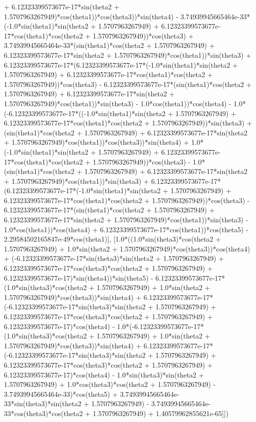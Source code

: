 + 6.12323399573677e-17*sin(theta2 + 1.5707963267949)*cos(theta1))*cos(theta3))*sin(theta4) - 3.74939945665464e-33*(-1.0*sin(theta1)*sin(theta2 + 1.5707963267949) + 6.12323399573677e-17*cos(theta1)*cos(theta2 + 1.5707963267949))*cos(theta3) + 3.74939945665464e-33*(sin(theta1)*cos(theta2 + 1.5707963267949) + 6.12323399573677e-17*sin(theta2 + 1.5707963267949)*cos(theta1))*sin(theta3) + 6.12323399573677e-17*(6.12323399573677e-17*(-1.0*sin(theta1)*sin(theta2 + 1.5707963267949) + 6.12323399573677e-17*cos(theta1)*cos(theta2 + 1.5707963267949))*cos(theta3) - 6.12323399573677e-17*(sin(theta1)*cos(theta2 + 1.5707963267949) + 6.12323399573677e-17*sin(theta2 + 1.5707963267949)*cos(theta1))*sin(theta3) - 1.0*cos(theta1))*cos(theta4) - 1.0*(-6.12323399573677e-17*((-1.0*sin(theta1)*sin(theta2 + 1.5707963267949) + 6.12323399573677e-17*cos(theta1)*cos(theta2 + 1.5707963267949))*sin(theta3) + (sin(theta1)*cos(theta2 + 1.5707963267949) + 6.12323399573677e-17*sin(theta2 + 1.5707963267949)*cos(theta1))*cos(theta3))*sin(theta4) + 1.0*(-1.0*sin(theta1)*sin(theta2 + 1.5707963267949) + 6.12323399573677e-17*cos(theta1)*cos(theta2 + 1.5707963267949))*cos(theta3) - 1.0*(sin(theta1)*cos(theta2 + 1.5707963267949) + 6.12323399573677e-17*sin(theta2 + 1.5707963267949)*cos(theta1))*sin(theta3) + 6.12323399573677e-17*(6.12323399573677e-17*(-1.0*sin(theta1)*sin(theta2 + 1.5707963267949) + 6.12323399573677e-17*cos(theta1)*cos(theta2 + 1.5707963267949))*cos(theta3) - 6.12323399573677e-17*(sin(theta1)*cos(theta2 + 1.5707963267949) + 6.12323399573677e-17*sin(theta2 + 1.5707963267949)*cos(theta1))*sin(theta3) - 1.0*cos(theta1))*cos(theta4) + 6.12323399573677e-17*cos(theta1))*cos(theta5) - 2.29584502165847e-49*cos(theta1)], [1.0*((1.0*sin(theta3)*cos(theta2 + 1.5707963267949) + 1.0*sin(theta2 + 1.5707963267949)*cos(theta3))*cos(theta4) + (-6.12323399573677e-17*sin(theta3)*sin(theta2 + 1.5707963267949) + 6.12323399573677e-17*cos(theta3)*cos(theta2 + 1.5707963267949) + 6.12323399573677e-17)*sin(theta4))*sin(theta5) - 6.12323399573677e-17*(1.0*sin(theta3)*cos(theta2 + 1.5707963267949) + 1.0*sin(theta2 + 1.5707963267949)*cos(theta3))*sin(theta4) + 6.12323399573677e-17*(-6.12323399573677e-17*sin(theta3)*sin(theta2 + 1.5707963267949) + 6.12323399573677e-17*cos(theta3)*cos(theta2 + 1.5707963267949) + 6.12323399573677e-17)*cos(theta4) - 1.0*(-6.12323399573677e-17*(1.0*sin(theta3)*cos(theta2 + 1.5707963267949) + 1.0*sin(theta2 + 1.5707963267949)*cos(theta3))*sin(theta4) + 6.12323399573677e-17*(-6.12323399573677e-17*sin(theta3)*sin(theta2 + 1.5707963267949) + 6.12323399573677e-17*cos(theta3)*cos(theta2 + 1.5707963267949) + 6.12323399573677e-17)*cos(theta4) - 1.0*sin(theta3)*sin(theta2 + 1.5707963267949) + 1.0*cos(theta3)*cos(theta2 + 1.5707963267949) - 3.74939945665464e-33)*cos(theta5) + 3.74939945665464e-33*sin(theta3)*sin(theta2 + 1.5707963267949) - 3.74939945665464e-33*cos(theta3)*cos(theta2 + 1.5707963267949) + 1.40579962855621e-65]])